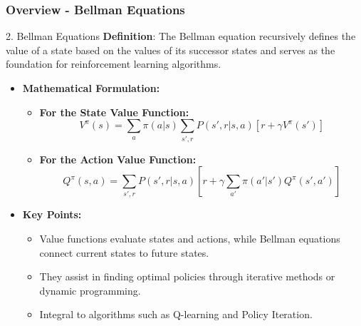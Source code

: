 \documentclass{beamer}
\begin{document}
\begin{frame}[fragile]
    \frametitle{Overview - Bellman Equations}
    \begin{block}{2. Bellman Equations}
        \textbf{Definition}: The Bellman equation recursively defines the value of a state based on the values of its successor states and serves as the foundation for reinforcement learning algorithms.
    \end{block}
    
    \begin{itemize}
        \item \textbf{Mathematical Formulation:}
        \begin{itemize}
            \item \textbf{For the State Value Function:}
            \[
            V^{\pi}(s) = \sum_{a} \pi(a|s) \sum_{s', r} P(s', r | s, a) \left[ r + \gamma V^{\pi}(s') \right]
            \]
            \item \textbf{For the Action Value Function:}
            \[
            Q^{\pi}(s, a) = \sum_{s', r} P(s', r | s, a) \left[ r + \gamma \sum_{a'} \pi(a'|s') Q^{\pi}(s', a') \right]
            \]
        \end{itemize}
    \end{itemize}
    
    \begin{itemize}
        \item \textbf{Key Points:}
        \begin{itemize}
            \item Value functions evaluate states and actions, while Bellman equations connect current states to future states.
            \item They assist in finding optimal policies through iterative methods or dynamic programming.
            \item Integral to algorithms such as Q-learning and Policy Iteration.
        \end{itemize}
    \end{itemize}
\end{frame}
\end{document}
